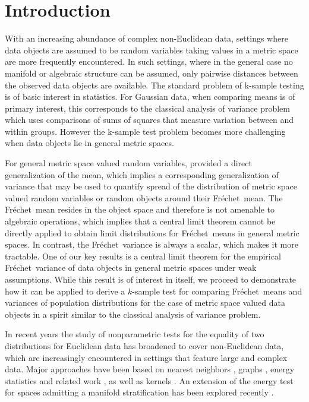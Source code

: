 \documentclass[lineno]{biometrika}
\newcommand{\no}{\noindent}
\def\cp{\citep}
\def\cp{\citep}
\def\F{Fr\'{e}chet}
\begin{document}
\section{Introduction}
\label{sec: intro}

\no With an increasing abundance of complex non-Euclidean data, settings where data objects are assumed to be random variables taking values in a metric space are more frequently encountered. In such settings, where in the general case no manifold or algebraic structure can be assumed, only pairwise distances between the observed data objects are available. The standard problem of k-sample testing is of basic interest in statistics.  For Gaussian data, when comparing means is of primary interest, this corresponds to the classical analysis of variance problem which uses comparisons of sums of squares that measure variation between and within groups. However the k-sample test problem becomes more challenging when data objects lie in general metric spaces.

For general metric space valued random variables, \cite{frec:48} provided a direct generalization of  the mean, which implies a corresponding generalization of variance that may be used to quantify spread of the distribution of metric space valued random variables or random objects around their \F \  mean. The \F \ mean resides in the object space and therefore is not amenable to algebraic operations, which implies that a central limit theorem cannot be directly applied to obtain limit distributions for \F \ means in general metric spaces.  In contrast, the \F \ variance is always a scalar, which makes it more tractable. One of our key results is a central limit theorem for the empirical \F \ variance of data objects in general metric spaces under weak assumptions. While this result is of interest in itself, we proceed to demonstrate how it can be applied to derive a $k$-sample test for comparing \F \ means and variances of population distributions for the case of metric space valued data objects in a spirit similar to the classical analysis of variance problem.
 
In recent years the study of nonparametric tests for the equality of two distributions for Euclidean data has broadened to cover non-Euclidean data, which are increasingly encountered in settings that feature large and complex data. Major approaches have been based on nearest neighbors \cp{henz:88,henz:99,schi:86}, graphs \cp{frie:79,chen:16, rose:05}, energy statistics \cp{szek:04,lyon:13,szek:17} and related work \cp{bari:04}, as well as  kernels \cp{gret:12,sejd:13}. An extension of the energy test for spaces admitting a manifold stratification \cp{patr:15} has been explored recently \citep{guo:17}. 
\end{document}
